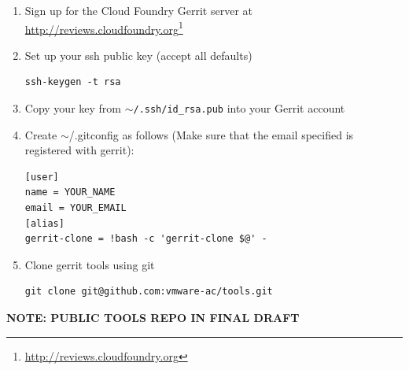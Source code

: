\begin{enumerate}
\item Sign up for the Cloud Foundry Gerrit server at \href{http://reviews.cloudfoundry.org}{http:/\slash reviews.cloudfoundry.org}\footnote{\href{http://reviews.cloudfoundry.org}{http:/\slash reviews.cloudfoundry.org}}

\item Set up your ssh public key (accept all defaults)

\begin{verbatim}
ssh-keygen -t rsa
\end{verbatim}


\item Copy your key from \texttt{\ensuremath{\sim}\slash .ssh\slash id\_rsa.pub} into your Gerrit account

\item Create \ensuremath{\sim}\slash .gitconfig as follows (Make sure that the email specified is registered with gerrit):

\begin{verbatim}
[user]
name = YOUR_NAME
email = YOUR_EMAIL
[alias]
gerrit-clone = !bash -c 'gerrit-clone $@' -
\end{verbatim}


\item Clone gerrit tools using git

\begin{verbatim}
git clone git@github.com:vmware-ac/tools.git
\end{verbatim}


\end{enumerate}

\textbf{NOTE: PUBLIC TOOLS REPO IN FINAL DRAFT}

